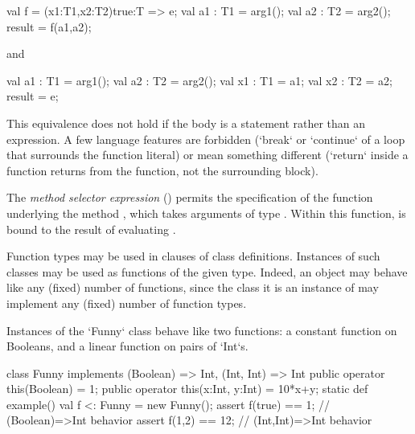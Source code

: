 \begin{xten}
{
  val f = (x1:T1,x2:T2){true}:T => e;
  val a1 : T1 = arg1();
  val a2 : T2 = arg2();
  result = f(a1,a2);
}
\end{xten}
and 
\begin{xten}
{
  val a1 : T1 = arg1();
  val a2 : T2 = arg2();
  {
     val x1 : T1 = a1;
     val x2 : T2 = a2;
     result = e;
  }  
}
\end{xten}
\noindent
This equivalence does not hold if the body is a statement rather than an expression.
A few language features are forbidden (\xcd`break` or \xcd`continue` of a loop
that surrounds the function literal) or mean something different (\xcd`return`
inside a function returns from the function, not the surrounding block). 


The \emph{method selector expression}  ()
permits the specification of the function underlying
the method , which takes arguments of type .
Within this function,  is bound to the result of evaluating .

Function types may be used in  clauses of class
definitions. Instances of such classes may be used as functions of the
given type.  Indeed, an object may behave like any (fixed) number of
functions, since the class it is an instance of may implement any
(fixed) number of function types.
\begin{eg}
Instances of the \xcd`Funny` class behave like two functions: 
a constant function on Booleans, and a linear function on 
pairs of \xcd`Int`s.  
\begin{xten}
class Funny implements (Boolean) => Int, 
                       (Int, Int) => Int
{
  public operator this(Boolean) = 1;
  public operator this(x:Int, y:Int) = 10*x+y;
  static def example() {
    val f <: Funny  = new Funny();
    assert f(true) == 1; // (Boolean)=>Int behavior
    assert f(1,2) == 12; // (Int,Int)=>Int behavior
  }
}
\end{xten}

\end{eg}


